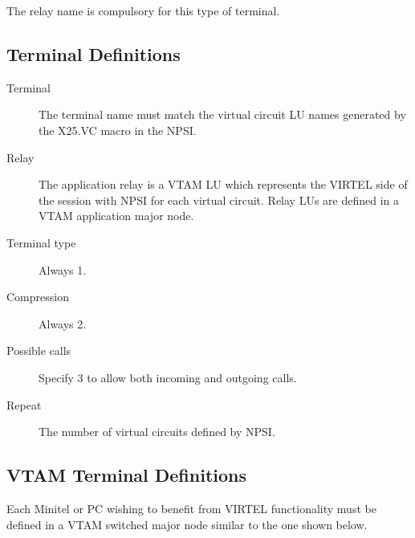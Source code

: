 \documentclass[letterpaper,10pt,english]{sphinxmanual}
\begin{document}
The relay name is compulsory for this type of terminal.


\ignorespaces 

\subsection{Terminal Definitions}
\label{\detokenize{connectivity_guide:index-63}}\label{\detokenize{connectivity_guide:id29}}\begin{description}
\item[{Terminal}] \leavevmode
The terminal name must match the virtual circuit LU names generated by the X25.VC macro in the NPSI.

\item[{Relay}] \leavevmode
The application relay is a VTAM LU which represents the VIRTEL side of the session with NPSI for each virtual circuit. Relay LUs are defined in a VTAM application major node.

\item[{Terminal type}] \leavevmode
Always 1.

\item[{Compression}] \leavevmode
Always 2.

\item[{Possible calls}] \leavevmode
Specify 3 to allow both incoming and outgoing calls.

\item[{Repeat}] \leavevmode
The number of virtual circuits defined by NPSI.

\end{description}

\ignorespaces 

\subsection{VTAM Terminal Definitions}
\label{\detokenize{connectivity_guide:index-64}}\label{\detokenize{connectivity_guide:id30}}
Each Minitel or PC wishing to benefit from VIRTEL functionality must be defined in a VTAM switched major node similar to the one shown below.
\end{document}
